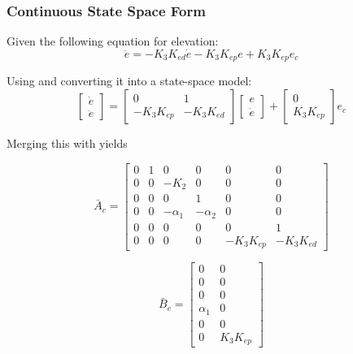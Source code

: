\subsubsection{Continuous State Space Form}
Given the following equation for elevation:
\begin{equation}\label{eq:elevation}
\ddot{e} = -K_3K_{ed}\dot{e} - K_3K_{ep}e +K_3K_{ep}e_c
\end{equation}

Using  and converting it into a state-space model:
$$
\begin{bmatrix}
\dot{e} \\
\ddot{e}
\end{bmatrix} = \begin{bmatrix}
0 & 1 \\
-K_3K_{ep} & -K_3K_{ed}
\end{bmatrix}\begin{bmatrix}
e \\
\dot{e}
\end{bmatrix}
+\begin{bmatrix}
0 \\
K_3K_{ep}
\end{bmatrix}e_c
$$

Merging this with  yields

\begin{equation}
\bar{A}_c =
\begin{bmatrix}
    0 & 1 & 0 & 0 & 0 & 0 \\
    0 & 0 & -K_2 & 0 & 0 & 0 \\
    0 & 0 & 0 & 1 & 0 & 0 \\
    0 & 0 & -\alpha_1 & - \alpha_2 & 0 & 0 \\
    0 & 0 & 0 & 0 & 0 & 1 \\
    0 & 0 & 0 & 0 & -K_3K_{ep} & -K_3K_{ed}
\end{bmatrix}
\end{equation}

\begin{equation}
\bar{B}_c =
\begin{bmatrix}
    0 & 0\\
    0 & 0 \\
    0 & 0 \\
    \alpha_1 & 0 \\
    0 & 0 \\
    0 & K_3K_{ep}
\end{bmatrix}
\end{equation}

